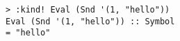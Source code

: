 \begin{repl}\begin{lstlisting}
> :kind! Eval (Snd '(1, "hello"))
Eval (Snd '(1, "hello")) :: Symbol
= "hello"\end{lstlisting}\end{repl}
